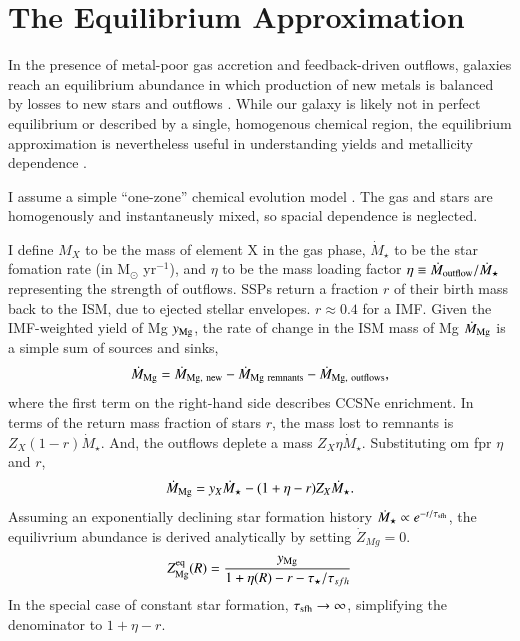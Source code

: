 \documentclass[12pt,oneside]{report}
\begin{document}
\chapter{The Equilibrium Approximation}\label{sec:equilibrium}

In the presence of metal-poor gas accretion and feedback-driven outflows, galaxies reach an equilibrium abundance in which production of new metals is balanced by losses to new stars and outflows \citep{larson72, dalcanton07, FD08, PS11, lilly13}.
While our galaxy is likely not in perfect equilibrium or described by a single, homogenous chemical region, the equilibrium approximation is nevertheless useful in understanding yields and metallicity dependence \citep[e.g.][]{james_dwarf,james+22,WAF17}. 

I assume a simple ``one-zone'' chemical evolution model \cite[e.g.][]{tinsley80, pagel09, matteucci21}.  The gas and stars are homogenously and instantaneusly mixed, so spacial dependence is neglected.

I define $M_{X}$ to be the mass of element X in the gas phase, $\dot{M}_\star$ to be the star fomation rate (in M$_\odot$ yr$^{-1}$), and $\eta$ to be the mass loading factor $\eta\equiv\dot{M}_{\rm outflow}/\dot{M}_\star$ representing the strength of outflows. 
SSPs return a fraction $r$ of their birth mass back to the ISM, due to ejected stellar envelopes. $r\approx0.4$ for a \citet{kroupa01} IMF.
Given the IMF-weighted yield of Mg $y_{\rm Mg}$, the rate of change in the ISM mass of Mg $\dot{M}_{\rm Mg}$ is a simple sum of sources and sinks,
\begin{equation}
    \dot{M}_{\rm Mg} = \dot{M}_{\rm Mg,~new} - \dot{M}_{\rm Mg~remnants} - \dot{M}_{\rm Mg,~outflows},
\end{equation}
where the first term on the right-hand side describes CCSNe enrichment. 
In terms of the return mass fraction of stars $r$, the mass lost to remnants is $Z_X (1-r)\dot{M}_\star$.  And, the outflows deplete a mass $Z_X \eta\dot{M}_\star$. Substituting om fpr $\eta$ and $r$,  
\begin{equation}
    \dot{M}_{\rm Mg}= y_{X} \dot{M}_\star - (1 + \eta - r) Z_{X} \dot{M}_\star.
\end{equation}
Assuming an exponentially declining star formation history $\dot{M}_\star \propto e^{-t/\tau_{\rm sfh}}$, the equilivrium abundance is derived analytically by setting $\dot{Z}_{Mg}=0$.
\begin{equation}\label{eq:z_eq}
    Z_{\rm Mg}^{\rm eq}(R) = \frac{y_{\rm Mg}}{1 + \eta(R) - r - \tau_\star / \tau_{sfh}}
\end{equation}
In the special case of constant star formation, $\tau_{\rm sfh}\to\infty$, simplifying the denominator to $1+\eta-r$.
\end{document}
